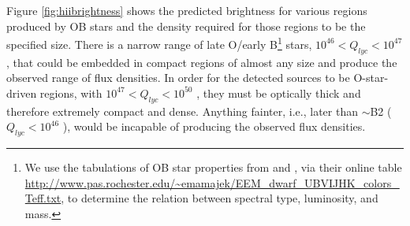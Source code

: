 \documentclass[twocolumn]{aastex61}
\begin{document}
Figure \ref{fig:hiibrightness} shows the predicted brightness for various \hii
regions produced by OB stars and the density required for those \hii regions
to be the specified size.  There is a narrow range of late O/early B\footnote{We use
the tabulations of OB star properties from \citet{Vacca1996a} and
\citet{Pecaut2013a}, via their online table
\url{http://www.pas.rochester.edu/~emamajek/EEM_dwarf_UBVIJHK_colors_Teff.txt},
to determine the relation between spectral type, luminosity, and mass.} stars,
$10^{46} < Q_{lyc} < 10^{47}$ \pers, that could be embedded in compact \hii
regions of almost any size and produce the observed range of flux densities.
In order for the detected sources to be O-star-driven \hii regions, with $10^{47}
< Q_{lyc} < 10^{50}$ \pers, they must be optically thick and therefore
extremely compact and dense.  
Anything fainter, i.e., later than $\sim$B2 ($Q_{lyc}<10^{46}$ \pers), would be
incapable of producing the observed flux densities.



\end{document}
